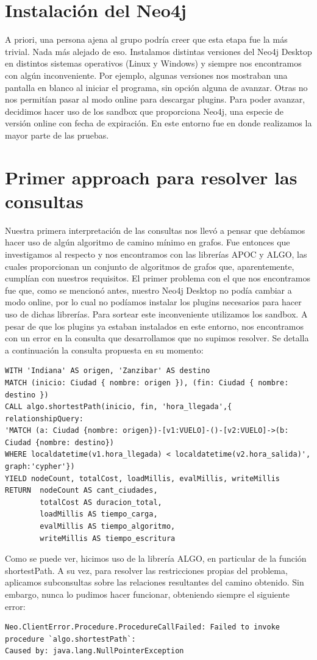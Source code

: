\documentclass[a4paper,11pt]{article}
\begin{document}
\section{Instalación del Neo4j}
A priori, una persona ajena al grupo podría creer que esta etapa fue la más trivial. Nada más alejado de eso.
Instalamos distintas versiones del Neo4j Desktop en distintos sistemas operativos (Linux y Windows) y siempre nos encontramos con algún inconveniente. Por ejemplo, algunas versiones nos mostraban una pantalla en blanco al iniciar el programa, sin opción alguna de avanzar. Otras no nos permitían pasar al modo online para descargar plugins.
Para poder avanzar, decidimos hacer uso de los sandbox que proporciona Neo4j, una especie de versión online con fecha de expiración. En este entorno fue en donde realizamos la mayor parte de las pruebas.

\section{Primer approach para resolver las consultas}
Nuestra primera interpretación de las consultas nos llevó a pensar que debíamos hacer uso de algún algoritmo de camino mínimo en grafos. Fue entonces que investigamos al respecto y nos encontramos con las librerías APOC y ALGO, las cuales proporcionan un conjunto de algoritmos de grafos que, aparentemente, cumplían con nuestros requisitos.
El primer problema con el que nos encontramos fue que, como se mencionó antes, nuestro Neo4j Desktop no podía cambiar a modo online, por lo cual no podíamos instalar los plugins necesarios para hacer uso de dichas librerías.
Para sortear este inconveniente utilizamos los sandbox. A pesar de que los plugins ya estaban instalados en este entorno, nos encontramos con un error en la consulta que desarrollamos que no supimos resolver.
Se detalla a continuación la consulta propuesta en su momento:
\begin{lstlisting}[frame=single]
WITH 'Indiana' AS origen, 'Zanzibar' AS destino
MATCH (inicio: Ciudad { nombre: origen }), (fin: Ciudad { nombre: destino })
CALL algo.shortestPath(inicio, fin, 'hora_llegada',{ relationshipQuery:
'MATCH (a: Ciudad {nombre: origen})-[v1:VUELO]-()-[v2:VUELO]->(b: Ciudad {nombre: destino})
WHERE localdatetime(v1.hora_llegada) < localdatetime(v2.hora_salida)', graph:'cypher'})
YIELD nodeCount, totalCost, loadMillis, evalMillis, writeMillis
RETURN 	nodeCount AS cant_ciudades,
		totalCost AS duracion_total,
		loadMillis AS tiempo_carga,
		evalMillis AS tiempo_algoritmo,
		writeMillis AS tiempo_escritura
\end{lstlisting}
Como se puede ver, hicimos uso de la librería ALGO, en particular de la función shortestPath. A su vez, para resolver las restricciones propias del problema, aplicamos subconsultas sobre las relaciones resultantes del camino obtenido.
Sin embargo, nunca lo pudimos hacer funcionar, obteniendo siempre el siguiente error:
\begin{lstlisting}[frame=single]
Neo.ClientError.Procedure.ProcedureCallFailed: Failed to invoke 
procedure `algo.shortestPath`:
Caused by: java.lang.NullPointerException
\end{lstlisting}
\end{document}
